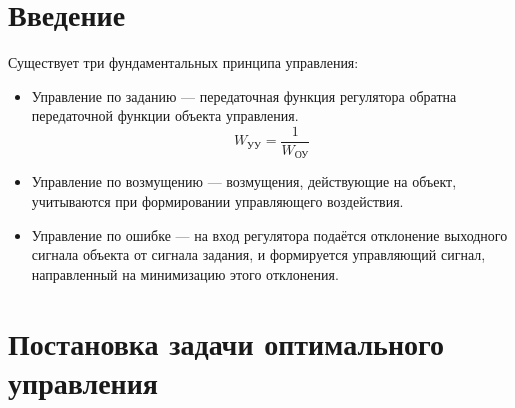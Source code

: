 \documentclass[preprint,russian,a5paper,10pt,twoside]{ncc}
\begin{document}

\setcounter{page}{2}
\thispagestyle{empty}
\mbox{}
\newpage
\tableofcontents
\newpage

\section{Введение\label{intro}}

Существует три фундаментальных принципа управления:
\begin{itemize}
\item Управление по заданию --- передаточная функция регулятора обратна передаточной функции объекта управления.
\begin{equation}
W_{\text{УУ}}=\frac{1}{W_{\text{ОУ}}}
\end{equation}
\item Управление по возмущению --- возмущения, действующие на объект, учитываются при формировании управляющего воздействия.
\item Управление по ошибке --- на вход регулятора подаётся отклонение выходного сигнала объекта от сигнала задания, и формируется управляющий сигнал, направленный на минимизацию этого отклонения.
\end{itemize}

\newpage

\section{Постановка задачи оптимального управления\label{task}}
\end{document}
